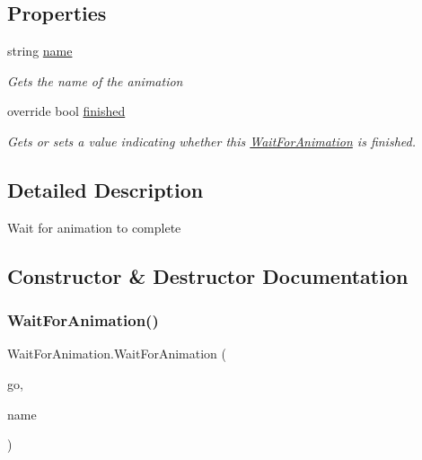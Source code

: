\subsection*{Properties}
\begin{DoxyCompactItemize}
\item 
string \hyperlink{class_wait_for_animation_a2bd9db632988be8570fb739741d80222}{name}
\begin{DoxyCompactList}\small\item\em Gets the name of the animation \end{DoxyCompactList}\item 
override bool \hyperlink{class_wait_for_animation_a0d22165f584e254745d7d666de0c14e4}{finished}
\begin{DoxyCompactList}\small\item\em Gets or sets a value indicating whether this \hyperlink{class_wait_for_animation}{Wait\+For\+Animation} is finished. \end{DoxyCompactList}\end{DoxyCompactItemize}


\subsection{Detailed Description}
Wait for animation to complete 



\subsection{Constructor \& Destructor Documentation}
\mbox{\label{class_wait_for_animation_a8a85909f01899724a26cd5451051039e}} 
\subsubsection{\texorpdfstring{Wait\+For\+Animation()}{WaitForAnimation()}\hspace{0.1cm}{\footnotesize\ttfamily [1/3]}}
{\footnotesize\ttfamily Wait\+For\+Animation.\+Wait\+For\+Animation (\begin{DoxyParamCaption}\item[{Game\+Object}]{go,  }\item[{string}]{name }\end{DoxyParamCaption})\hspace{0.3cm}{\ttfamily [inline]}}



